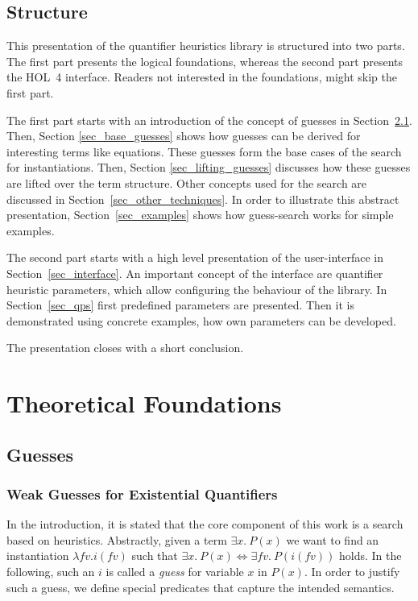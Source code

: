 \documentclass[a4paper,12pt,DIV=12,oneside]{scrbook}
\newcommand{\fv}{\textit{fv}}
\theoremstyle{definition}
\theoremstyle{remark}
\begin{document}
\section{Structure}

This presentation of the quantifier heuristics library is structured into two parts.
The first part presents the logical foundations, whereas the second part presents the HOL~4 interface.
Readers not interested in the foundations, might skip the first part.

The first part starts with an introduction of the concept of guesses in Section~\ref{sec_guesses}. Then,
Section \ref{sec_base_guesses} shows how guesses can be derived for interesting terms like equations.
These guesses form the base cases of the search for instantiations. Then, Section \ref{sec_lifting_guesses}
discusses how these guesses are lifted over the term structure. Other concepts used for the search
are discussed in Section~\ref{sec_other_techniques}. In order to illustrate
this abstract presentation, Section~\ref{sec_examples} shows how
guess-search works for simple examples.

The second part starts with a high level presentation of the user-interface in
Section~\ref{sec_interface}. An important concept of the interface are
quantifier heuristic parameters, which allow configuring the behaviour of the library.
In Section~\ref{sec_qps} first predefined parameters are presented.
Then it is demonstrated using concrete examples, how own parameters can be developed.

The presentation closes with a short conclusion.


\chapter{Theoretical Foundations}

\section{Guesses}\label{sec_guesses}

\subsection{Weak Guesses for Existential Quantifiers}

In the introduction, it is stated that the core component of this work
is a search based on heuristics. Abstractly, given a term $\exists x.\
P(x)$ we want to find an instantiation $\lambda \fv. i(\fv)$ such that
$\exists x.\ P(x) \Longleftrightarrow \exists \fv.\ P(i(\fv))$
holds. In the following, such an $i$ is called a \emph{guess} for
variable $x$ in $P(x)$. In order to justify such a guess, we define
special predicates that capture the intended semantics.
\end{document}
